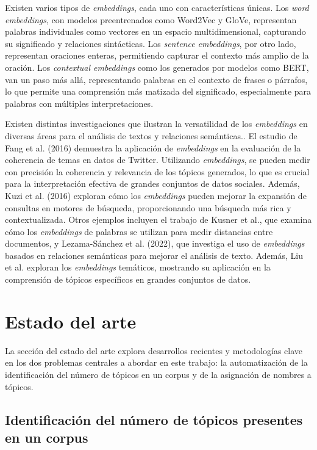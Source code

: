 Existen varios tipos de \textit{embeddings}, cada uno con características únicas. Los \textit{word embeddings}, con modelos preentrenados como Word2Vec y GloVe, representan palabras individuales como vectores en un espacio multidimensional, capturando su significado y relaciones sintácticas. Los \textit{sentence embeddings}, por otro lado, representan oraciones enteras, permitiendo capturar el contexto más amplio de la oración. Los \textit{contextual embeddings} como los generados por modelos como BERT, van un paso más allá, representando palabras en el contexto de frases o párrafos, lo que permite una comprensión más matizada del significado, especialmente para palabras con múltiples interpretaciones.

Existen distintas investigaciones que ilustran la versatilidad de los \textit{embeddings} en diversas áreas para el análisis de textos y relaciones semánticas.. El estudio de Fang et al. (2016) demuestra la aplicación de \textit{embeddings} en la evaluación de la coherencia de temas en datos de Twitter. Utilizando \textit{embeddings}, se pueden medir con precisión la coherencia y relevancia de los tópicos generados, lo que es crucial para la interpretación efectiva de grandes conjuntos de datos sociales. Además, Kuzi et al. (2016) exploran cómo los \textit{embeddings} pueden mejorar la expansión de consultas en motores de búsqueda, proporcionando una búsqueda más rica y contextualizada. Otros ejemplos incluyen el trabajo de Kusner et al., que examina cómo los \textit{embeddings} de palabras se utilizan para medir distancias entre documentos, y Lezama-Sánchez et al. (2022), que investiga el uso de \textit{embeddings} basados en relaciones semánticas para mejorar el análisis de texto. Además, Liu et al. exploran los \textit{embeddings} temáticos, mostrando su aplicación en la comprensión de tópicos específicos en grandes conjuntos de datos. 

\section{Estado del arte}

La sección del estado del arte explora desarrollos recientes y metodologías clave en los dos problemas centrales a abordar en este trabajo: la automatizaci\'on de la identificación del número de tópicos en un corpus y de la asignaci\'on de nombres a t\'opicos. 

\subsection{Identificación del n\'umero de t\'opicos presentes en un corpus}

